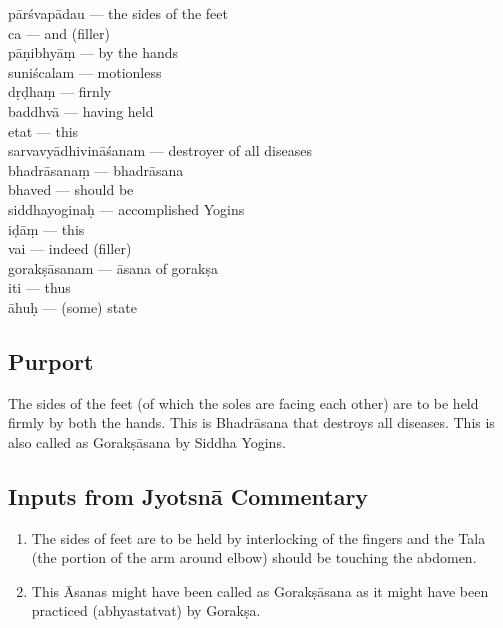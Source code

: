 \begin{multicols}{2}
pārśvapādau ---  the sides of the feet  \\
ca ---  and (filler) \\
pāṇibhyāṃ ---  by the hands  \\
suniścalam --- motionless  \\
dṛḍhaṃ ---  firnly \\
baddhvā --- having held  \\
etat ---  this  \\
sarvavyādhivināśanam --- destroyer of all diseases  \\
bhadrāsanaṃ --- bhadrāsana \\
bhaved --- should be \\
siddhayoginaḥ ---  accomplished Yogins \\
iḍāṃ ---  this  \\
vai ---  indeed (filler) \\
gorakṣāsanam ---  āsana of gorakṣa \\
iti --- thus  \\
āhuḥ  --- (some) state
\end{multicols}
\vspace{-10pt}

\subsection*{Purport}
\vspace{-10pt}

The sides of the feet (of which the soles are facing each other) are to be held firmly by both the hands. This is Bhadrāsana that destroys all diseases. This is also called as Gorakṣāsana by Siddha Yogins.
\vspace{-10pt}

\subsection*{Inputs from Jyotsnā Commentary}
\vspace{-10pt}

\begin{enumerate}
\itemsep=0pt
\item The sides of feet are to be held by interlocking of the fingers and the Tala (the portion of the arm around elbow) should be touching the abdomen. 
\item This Āsanas might have been called as Gorakṣāsana as it might have been practiced (abhyastatvat) by Gorakṣa. 
\end{enumerate}
